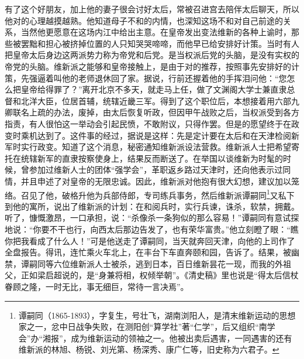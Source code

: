   有了这个好朋友，加上他的妻子很会讨好太后，常被召进宫去陪伴太后聊天，所以他对的心理越摸越熟。他知道母子不和的内情，也深知这场不和对自己前途的关系，当然他更愿意在这场内江中给出主意。在皇帝发出变法维新的各种上谕时，那些被罢黜和担心被挤掉位置的人只知哭哭啼啼，而他早已给安排好计策。当时有人把皇帝太后身边这两派势力称为帝党和后党。是当权派后党的头脑，是没有实权的帝党的头脑。维新派之能够和皇帝接触上，是由于对的推荐，按照事先安排好的计策，先强逼着叫他的老师退休回了家。据说，行前还握着他的手挥泪问他：“您怎么把皇帝给得罪了？”离开北京不多天，就走马上任，做了文渊阁大学士兼直隶总督和北洋大臣，位居首辅，统辖近畿三军。得到了这个职位后，本想接着用六部九卿联名上疏的办法，废掉，由太后恢复听政，但因甲午战败之后，当权派受到各方指责，有人很怕这一举动会引起民愤，不敢附议，只得作罢。但是的愿望终于在政变时乘机达到了。这件事的经过，据说是这样：先是定计要在太后和在天津检阅新军时实行政变。知道了这个消息，秘密通知维新派设法营救。维新派人士把希望寄托在统辖新军的直隶按察使身上，结果反而断送了。在举国以谈维新为时髦的时候，曾参加过维新人士的团体“强学会”，革职返乡路过天津时，还向他表示过同情，并且申述了对皇帝的无限忠诚。因此，维新派对他抱有很大幻想，建议加以笼络。召见了他，破格升他为兵部侍郎，专司练兵事务，然后维新派谭嗣同\footnote{谭嗣同（1865-1893），字复生，号壮飞，湖南浏阳人，是清末维新运动的思想家之一，忿中日战争失败，在测阳创“算学社”著“仁学”，后又组织“南学会”办“湘报”，成为维新运动的领袖之一。他被出卖后遇害，一同遇害的还有维新派的林旭、杨锐、刘光第、杨深秀、康广仁等，旧史称为六君子。}又私下到他的寓所，说出了维新派的计划：在和阅兵时，实行兵谏，诛杀，软禁，拥戴。听了，慷慨激昂，一口承担，说：“杀像杀一条狗似的那么容易！”谭嗣同有意试探地说：“你要不干也行，向西太后那边告发了，也有荣华富贵。”他立刻瞪了眼：“瞧你把我看成了什么人！”可是他送走了谭嗣同，当天就奔回天津，向他的上司作了全盘报告。得讯，连忙乘火车北上，在丰台下车直奔颐和园，告诉了。结果，被幽禁，谭嗣同等六位维新派人士被杀，逃到日本，百日维新昙花一现，而我的外祖父，正如梁启超说的，是“身兼将相，权倾举朝”。《清史稿》里也说是“得太后信杖眷顾之隆，一时无比，事无细巨，常待一言决焉”。\\

